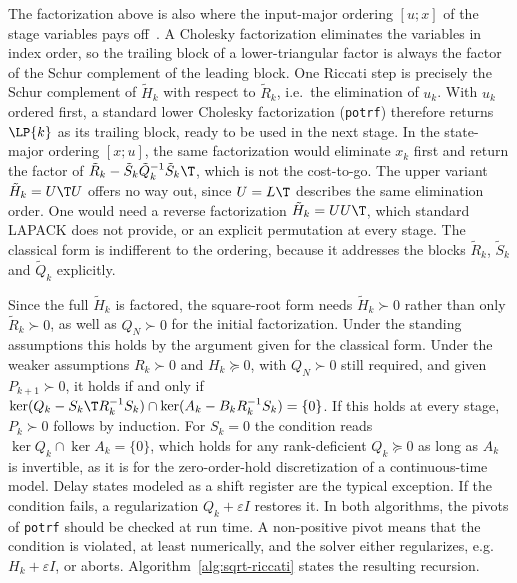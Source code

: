 The factorization above is also where the input-major ordering $[u;x]$ of the
stage variables pays off~\cite{frison2020hpipm}. A Cholesky factorization eliminates the variables in
index order, so the trailing block of a lower-triangular factor is always the
factor of the Schur complement of the leading block. One Riccati step is precisely
the Schur complement of $\tilde{H}_k$ with respect to $\tilde{R}_k$, i.e.\ the
elimination of $u_k$. With $u_k$ ordered first, a standard lower Cholesky
factorization (\texttt{potrf}) therefore returns $\LP{k}$ as its trailing block,
ready to be used in the next stage. In the state-major ordering $[x;u]$, the same
factorization would eliminate $x_k$ first and return the factor of
$\tilde{R}_k - \tilde{S}_k \tilde{Q}_k^{-1} \tilde{S}_k\T$, which is not the
cost-to-go. The upper variant $\tilde{H}_k = U\T U$ offers no way out, since
$U = L\T$ describes the same elimination order. One would need a reverse
factorization $\tilde{H}_k = U U\T$, which standard LAPACK does not provide, or an
explicit permutation at every stage. The classical form is indifferent to the
ordering, because it addresses the blocks $\tilde{R}_k$, $\tilde{S}_k$ and
$\tilde{Q}_k$ explicitly.

Since the full $\tilde{H}_k$ is factored, the square-root form needs
$\tilde{H}_k \succ 0$ rather than only $\tilde{R}_k \succ 0$, as well as
$Q_N \succ 0$ for the initial factorization. Under the standing assumptions this
holds by the argument given for the classical form. Under the weaker assumptions
$R_k\succ0$ and $H_k\succeq0$, with $Q_N\succ0$ still required, and given $P_{k+1}\succ0$,
it holds if and only if
$\ker(Q_k-S_k\T R_k^{-1}S_k)\cap\ker(A_k-B_kR_k^{-1}S_k)=\{0\}$.
If this holds at every stage, $P_k \succ 0$ follows by induction.
For $S_k=0$ the condition reads $\ker Q_k\cap\ker A_k=\{0\}$, which holds for any rank-deficient
$Q_k\succeq0$ as long as $A_k$ is invertible, as it is for the zero-order-hold
discretization of a continuous-time model. Delay states modeled as a shift register
are the typical exception.
If the condition fails, a regularization $Q_k+\varepsilon I$ restores it.
In both algorithms, the pivots of \texttt{potrf} should be checked at run time.
A non-positive pivot means that the condition is violated, at least numerically,
and the solver either regularizes, e.g.\ $H_k + \varepsilon I$, or aborts.
Algorithm~\ref{alg:sqrt-riccati} states the resulting recursion.

